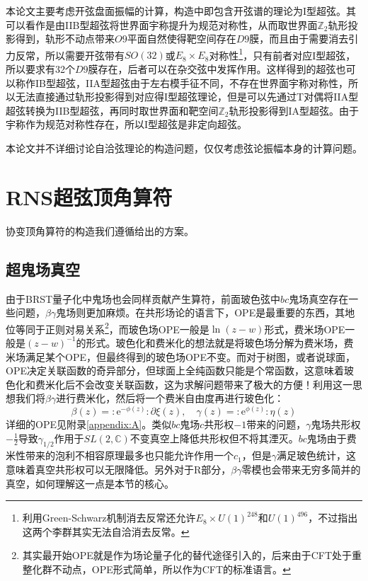 本论文主要考虑开弦盘面振幅的计算，构造中即包含开弦谱的理论为I型超弦。其可以看作是由IIB型超弦将世界面宇称提升为规范对称性，从而取世界面$\mathbb{Z}_2$轨形投影得到，轨形不动点带来$O9$平面自然使得靶空间存在$D9$膜，而且由于需要消去引力反常，所以需要开弦带有$SO(32)$或$E_8\times E_8$对称性\footnote{利用Green-Schwarz机制消去反常还允许$E_8\times U(1)^{248}$和$U(1)^{496}$，不过\cite{PhysRevLett.105.071601}指出这两个李群其实无法自洽消去反常。}，只有前者对应I型超弦，所以要求有32个$D9$膜存在，后者可以在杂交弦中发挥作用。这样得到的超弦也可以称作IB型超弦，IIA型超弦由于左右模手征不同，不存在世界面宇称对称性，所以无法直接通过轨形投影得到对应得I型超弦理论，但是可以先通过T对偶将IIA型超弦转换为IIB型超弦，再同时取世界面和靶空间$\mathbb{Z}_2$轨形投影得到IA型超弦。由于宇称作为规范对称性存在，所以I型超弦是非定向超弦。

本论文并不详细讨论自洽弦理论的构造问题，仅仅考虑弦论振幅本身的计算问题。

\section{RNS超弦顶角算符}
协变顶角算符的构造我们遵循\cite{Friedan:1985ge,Knizhnik:1985ke}给出的方案。
\subsection{超鬼场真空}
由于BRST量子化中鬼场也会同样贡献产生算符，前面玻色弦中$bc$鬼场真空存在一些问题，$\beta\gamma$鬼场则更加麻烦。在共形场论的语言下，OPE是最重要的东西，其地位等同于正则对易关系\footnote{其实最开始OPE就是作为场论量子化的替代途径引入的，后来由于CFT处于重整化群不动点，OPE形式简单，所以作为CFT的标准语言。}，而玻色场OPE一般是$\ln(z-w)$形式，费米场OPE一般是$(z-w)^{-1}$的形式。玻色化和费米化的想法就是将玻色场分解为费米场，费米场满足某个OPE，但最终得到的玻色场OPE不变。而对于树图，或者说球面，OPE决定关联函数的奇异部分，但球面上全纯函数只能是个常函数，这意味着玻色化和费米化后不会改变关联函数，这为求解问题带来了极大的方便！利用这一思想我们将$\beta\gamma$进行费米化，然后将一个费米自由度再进行玻色化：
\begin{equation}
	\label{eq:3.19}
	\beta(z)=:\mathrm{e}^{-\phi(z)}:\partial\xi(z),\quad\gamma(z)=:\mathrm{e}^{\phi(z)}:\eta(z)
\end{equation}
详细的OPE见附录\ref{appendix:A}。类似$bc$鬼场$c$共形权$-1$带来的问题，$\gamma$鬼场共形权$-\frac12$导致$\gamma_{1/2}$作用于$SL(2,\mathbb{C})$不变真空上降低共形权但不将其湮灭。$bc$鬼场由于费米性带来的泡利不相容原理最多也只能允许作用一个$c_1$，但是$\gamma$满足玻色统计，这意味着真空共形权可以无限降低。另外对于R部分，$\beta\gamma$零模也会带来无穷多简并的真空，如何理解这一点是本节的核心。

